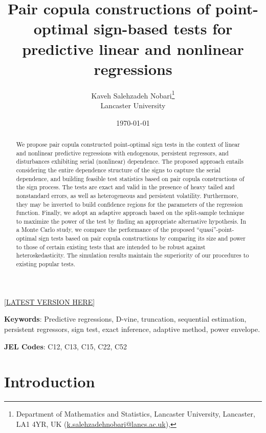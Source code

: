 \documentclass[harvard,11pt]{article}
\begin{document}
\title{{Pair copula constructions of point-optimal sign-based tests for predictive linear and nonlinear regressions}}
\author{Kaveh Salehzadeh Nobari\thanks{%
Department of Mathematics and Statistics, Lancaster University, Lancaster, LA1 4YR, UK
(\href{emailto: k.salehzadehnobari@lancs.ac.uk}{k.salehzadehnobari@lancs.ac.uk}),}
\\Lancaster University}
\date{\today}
\maketitle
\begin{center}
[\href{https://kavehsn.github.io/Job-Market-Paper/PCC_POS_2020.pdf}{\underline{LATEST VERSION HERE}}]
\end{center}


\begin{abstract}
We propose pair copula constructed point-optimal sign tests in the context of linear and nonlinear predictive regressions with endogenous, persistent regressors, and disturbances exhibiting serial (nonlinear) dependence. The proposed approach entails considering the entire dependence structure of the signs to capture the serial dependence, and building feasible test statistics based on pair copula constructions of the sign process. The tests are exact and valid in the presence of heavy tailed and nonstandard errors, as well as heterogeneous and persistent volatility. Furthermore, they may be inverted to build confidence regions for the parameters of the regression function. Finally, we adopt an adaptive approach based on the split-sample technique to maximize the power of the test by finding an appropriate alternative hypothesis. In a Monte Carlo study, we compare the performance of the proposed \textquotedblleft quasi\textquotedblright-point-optimal sign tests based on pair copula constructions by comparing its size and power to those of certain existing tests that are intended to be robust against heteroskedasticity. The simulation results maintain the superiority of our procedures to existing popular tests.   
\end{abstract}


\noindent \textbf{Keywords}: Predictive regressions, D-vine, truncation, sequential estimation, persistent regressors, sign test, exact inference, adaptive method, power envelope.

\noindent \textbf{JEL Codes}: C12, C13, C15, C22, C52

\newpage
\section{Introduction \label{Introduction}}
\end{document}

